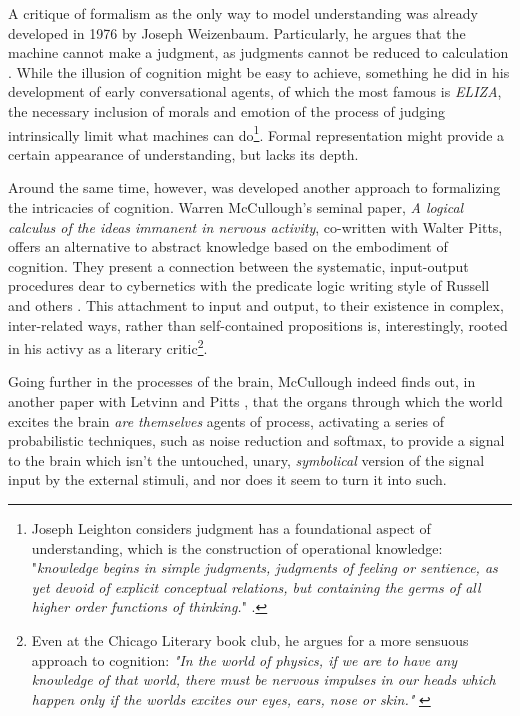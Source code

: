 A critique of formalism as the only way to model understanding was already developed in 1976 by Joseph Weizenbaum. Particularly, he argues that the machine cannot make a judgment, as judgments cannot be reduced to calculation \citep{weizenbaum_computer_1976}. While the illusion of cognition might be easy to achieve, something he did in his development of early conversational agents, of which the most famous is \emph{ELIZA}, the necessary inclusion of morals and emotion of the process of judging intrinsically limit what machines can do\footnote{Joseph Leighton considers judgment has a foundational aspect of understanding, which is the construction of operational knowledge: "\emph{knowledge begins in simple judgments, judgments of feeling or sentience, as yet devoid of explicit conceptual relations, but containing the germs of all higher order functions of thinking.}" \citep{leighton_objects_1907}.}. Formal representation might provide a certain appearance of understanding, but lacks its depth.

Around the same time, however, was developed another approach to formalizing the intricacies of cognition. Warren McCullough's seminal paper, \emph{A logical calculus of the ideas immanent in nervous activity}, co-written with Walter Pitts, offers an alternative to abstract knowledge based on the embodiment of cognition. They present a connection between the systematic, input-output procedures dear to cybernetics with the predicate logic writing style of Russell and others \citep{mcculloch_logical_1990}. This attachment to input and output, to their existence in complex, inter-related ways, rather than self-contained propositions is, interestingly, rooted in his activy as a literary critic\footnote{Even at the Chicago Literary book club, he argues for a more sensuous approach to cognition: \emph{"In the world of physics, if we are to have any knowledge of that world, there must be nervous impulses in our heads which happen only if the worlds excites our eyes, ears, nose or skin."} \citep{mcculloch_delusion_1953}}.

Going further in the processes of the brain, McCullough indeed finds out, in another paper with Letvinn and Pitts \citep{lettvin_what_1959}, that the organs through which the world excites the brain \emph{are themselves} agents of process, activating a series of probabilistic techniques, such as noise reduction and softmax, to provide a signal to the brain which isn't the untouched, unary, \emph{symbolical} version of the signal input by the external stimuli, and nor does it seem to turn it into such.

